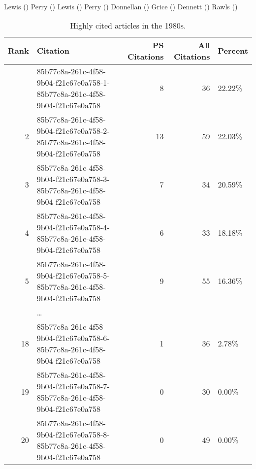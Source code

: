 \documentclass[
  10pt,
  letterpaper,
  DIV=11,
  numbers=noendperiod,
  twoside]{scrartcl}
\begin{document}
Lewis ()
Perry ()
Lewis ()
Perry ()
Donnellan ()
Grice ()
Dennett ()
Rawls ()

\begin{longtable}[]{@{}rlrrl@{}}

\caption{\label{tbl-1980s-inbound}Highly cited articles in the 1980s.}

\tabularnewline

\toprule\noalign{}
Rank & Citation & PS Citations & All Citations & Percent \\
\midrule\noalign{}
\endhead
\bottomrule\noalign{}
\endlastfoot
1 &
85b77c8a-261c-4f58-9b04-f21c67e0a758-1-85b77c8a-261c-4f58-9b04-f21c67e0a758
& 8 & 36 & 22.22\% \\
2 &
85b77c8a-261c-4f58-9b04-f21c67e0a758-2-85b77c8a-261c-4f58-9b04-f21c67e0a758
& 13 & 59 & 22.03\% \\
3 &
85b77c8a-261c-4f58-9b04-f21c67e0a758-3-85b77c8a-261c-4f58-9b04-f21c67e0a758
& 7 & 34 & 20.59\% \\
4 &
85b77c8a-261c-4f58-9b04-f21c67e0a758-4-85b77c8a-261c-4f58-9b04-f21c67e0a758
& 6 & 33 & 18.18\% \\
5 &
85b77c8a-261c-4f58-9b04-f21c67e0a758-5-85b77c8a-261c-4f58-9b04-f21c67e0a758
& 9 & 55 & 16.36\% \\
& \ldots{} & & & \\
18 &
85b77c8a-261c-4f58-9b04-f21c67e0a758-6-85b77c8a-261c-4f58-9b04-f21c67e0a758
& 1 & 36 & 2.78\% \\
19 &
85b77c8a-261c-4f58-9b04-f21c67e0a758-7-85b77c8a-261c-4f58-9b04-f21c67e0a758
& 0 & 30 & 0.00\% \\
20 &
85b77c8a-261c-4f58-9b04-f21c67e0a758-8-85b77c8a-261c-4f58-9b04-f21c67e0a758
& 0 & 49 & 0.00\% \\

\end{longtable}
\end{document}
